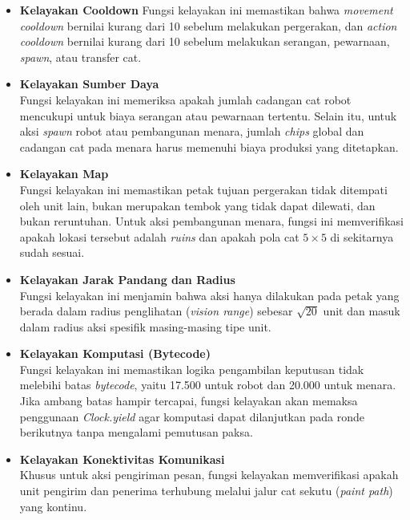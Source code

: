 \begin{itemize}
    \item \textbf{Kelayakan Cooldown}
          Fungsi kelayakan ini memastikan bahwa \textit{movement cooldown} bernilai kurang dari 10 sebelum melakukan pergerakan, dan \textit{action cooldown} bernilai kurang dari 10 sebelum melakukan serangan, pewarnaan, \textit{spawn}, atau transfer cat.

    \item \textbf{Kelayakan Sumber Daya}\\
          Fungsi kelayakan ini memeriksa apakah jumlah cadangan cat robot mencukupi untuk biaya serangan atau pewarnaan tertentu. Selain itu, untuk aksi \textit{spawn} robot atau pembangunan menara, jumlah \textit{chips} global dan cadangan cat pada menara harus memenuhi biaya produksi yang ditetapkan.

    \item \textbf{Kelayakan Map}\\
          Fungsi kelayakan ini memastikan petak tujuan pergerakan tidak ditempati oleh unit lain, bukan merupakan tembok yang tidak dapat dilewati, dan bukan reruntuhan. Untuk aksi pembangunan menara, fungsi ini memverifikasi apakah lokasi tersebut adalah \textit{ruins} dan apakah pola cat $5\times5$ di sekitarnya sudah sesuai.

    \item \textbf{Kelayakan Jarak Pandang dan Radius}\\
          Fungsi kelayakan ini menjamin bahwa aksi hanya dilakukan pada petak yang berada dalam radius penglihatan (\textit{vision range}) sebesar $\sqrt{20}$ unit dan masuk dalam radius aksi spesifik masing-masing tipe unit.

    \item \textbf{Kelayakan Komputasi (Bytecode)}\\
          Fungsi kelayakan ini memastikan logika pengambilan keputusan tidak melebihi batas \textit{bytecode}, yaitu 17.500 untuk robot dan 20.000 untuk menara. Jika ambang batas hampir tercapai, fungsi kelayakan akan memaksa penggunaan \textit{Clock.yield} agar komputasi dapat dilanjutkan pada ronde berikutnya tanpa mengalami pemutusan paksa.

    \item \textbf{Kelayakan Konektivitas Komunikasi}\\
          Khusus untuk aksi pengiriman pesan, fungsi kelayakan memverifikasi apakah unit pengirim dan penerima terhubung melalui jalur cat sekutu (\textit{paint path}) yang kontinu.
\end{itemize}

